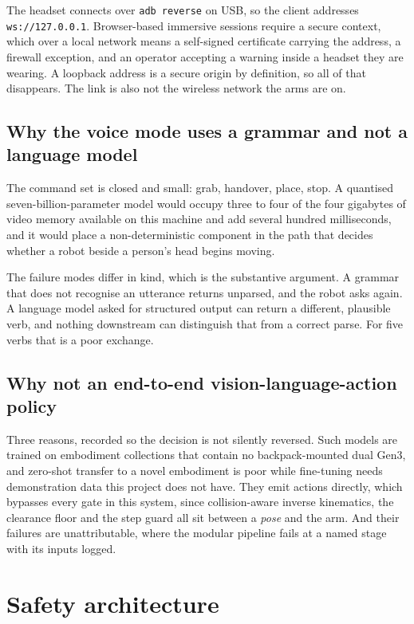 The headset connects over \texttt{adb reverse} on USB, so the client addresses
\texttt{ws://127.0.0.1}. Browser-based immersive sessions require a secure
context, which over a local network means a self-signed certificate carrying
the address, a firewall exception, and an operator accepting a warning inside
a headset they are wearing. A loopback address is a secure origin by
definition, so all of that disappears. The link is also not the wireless
network the arms are on.

\subsection{Why the voice mode uses a grammar and not a language model}

The command set is closed and small: grab, handover, place, stop. A quantised
seven-billion-parameter model would occupy three to four of the four gigabytes
of video memory available on this machine and add several hundred milliseconds,
and it would place a non-deterministic component in the path that decides
whether a robot beside a person's head begins moving.

The failure modes differ in kind, which is the substantive argument. A grammar
that does not recognise an utterance returns unparsed, and the robot asks
again. A language model asked for structured output can return a different,
plausible verb, and nothing downstream can distinguish that from a correct
parse. For five verbs that is a poor exchange.

\subsection{Why not an end-to-end vision-language-action policy}

Three reasons, recorded so the decision is not silently reversed. Such models
are trained on embodiment collections that contain no backpack-mounted dual
Gen3, and zero-shot transfer to a novel embodiment is poor while fine-tuning
needs demonstration data this project does not have. They emit actions
directly, which bypasses every gate in this system, since collision-aware
inverse kinematics, the clearance floor and the step guard all sit between a
\emph{pose} and the arm. And their failures are unattributable, where the
modular pipeline fails at a named stage with its inputs logged.

\section{Safety architecture}

